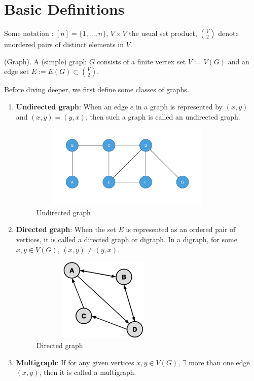 \chapter{Basic Definitions}

Some notation : $[n] = \{1,\ldots,n\}$, $V \times V$ the usual set product, $\binom{V}{2}$ denote unordered pairs of distinct elements in $V$. 
%
\begin{defn}(Graph).  
A (simple) graph $G$ consists of a finite vertex set $V := V(G)$ and an edge set $E := E(G) \subset \binom{V}{2}.$  
\end{defn}
Before diving deeper, we first define some classes of graphs.
\begin{enumerate}
    \item \textbf{Undirected graph}: When an edge $e$ in a graph is represented by $(x,y)$ and $(x,y)=(y,x)$, then such a graph is called an undirected graph.
    \begin{figure}[hbt!]
        \centering
	\includegraphics[height=4cm,width=9.5cm]{images/undirected.png}
	\caption{Undirected graph}
    \end{figure}
    \item \textbf{Directed graph}: When the set $E$ is represented as an ordered pair of vertices, it is called a directed graph or digraph. In a digraph, for some $x,y \in V(G)$, $(x,y) \neq (y,x)$.
    \begin{figure}[hbt!]
        \centering
	\includegraphics[height=4cm,width=7cm]{images/directed.png}
	\caption{Directed graph}
    \end{figure}
    \item \textbf{Multigraph}: If for any given vertices $x,y \in V(G)$, $\exists$ more than one edge $(x,y)$, then it is called a multigraph.

\end{enumerate}
